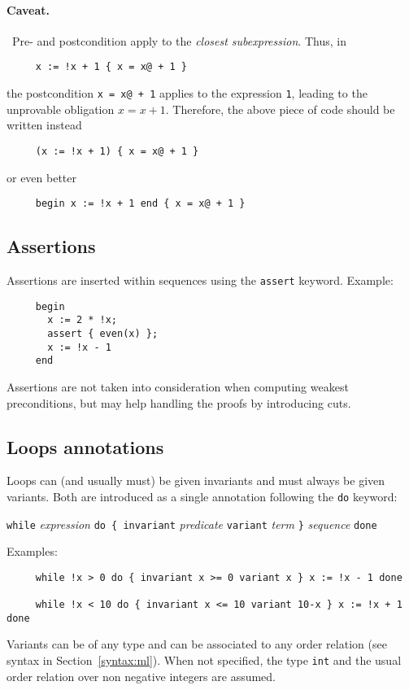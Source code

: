\documentclass[a4paper,12pt]{report}
\makeatletter
\newcommand{\indextt}[1]{\index{#1@\texttt{#1}}}
\newcommand{\caveat}{\paragraph{Caveat.}}
\makeatother
\begin{document}
\caveat\ Pre- and postcondition apply to the \emph{closest
subexpression}. Thus, in
\begin{verbatim}
     x := !x + 1 { x = x@ + 1 }
\end{verbatim}
the postcondition \texttt{x = x@ + 1} applies to the expression
\texttt{1}, leading to the unprovable obligation $x=x+1$. Therefore,
the above piece of code should be written instead
\begin{verbatim}
     (x := !x + 1) { x = x@ + 1 }
\end{verbatim}
or even better
\begin{verbatim}
     begin x := !x + 1 end { x = x@ + 1 }
\end{verbatim}


\subsection{Assertions}
Assertions are inserted within sequences using the \texttt{assert}
keyword. Example:
\begin{verbatim}
     begin 
       x := 2 * !x;
       assert { even(x) };
       x := !x - 1
     end
\end{verbatim}
Assertions are not taken into consideration when computing weakest
preconditions, but may help handling the proofs by introducing cuts.


\subsection{Loops annotations}
\indextt{while}
Loops can (and usually must) be given invariants and must always be
given variants. Both are introduced as a single annotation following
the \texttt{do} keyword:
\begin{center}
  \texttt{while} \textsl{expression} \texttt{do \{ invariant}
  \emph{predicate} \texttt{variant} 
  \textsl{term} \texttt{\}} \textsl{sequence} \texttt{done}
\end{center}
Examples:
\begin{verbatim}
     while !x > 0 do { invariant x >= 0 variant x } x := !x - 1 done

     while !x < 10 do { invariant x <= 10 variant 10-x } x := !x + 1 done
\end{verbatim}
Variants can be of any type and can be associated to any order
relation (see syntax in Section~\ref{syntax:ml}). When not specified,
the type \texttt{int} and the usual order relation over non negative
integers are assumed.
\end{document}
